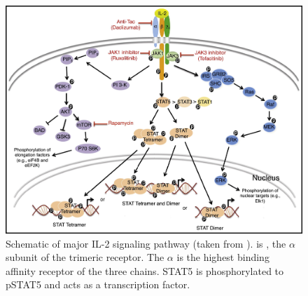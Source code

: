 \begin{figure}[h]
\centering
\includegraphics[scale=0.75]{IL2/figures/IL2-pathway.jpg}
{Schematic of major IL-2 signaling pathway (taken from \citet{Liao:2013jt}).}
{
 is , the $\alpha$ subunit of the trimeric  receptor.
The $\alpha$ is the highest binding affinity receptor of the three chains.
STAT5 is phosphorylated to pSTAT5 and acts as a transcription factor.
}
\end{figure}


